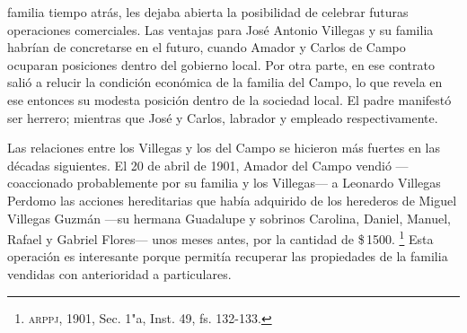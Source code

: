 \documentclass[14pt,twoside,final]{extbook} %
\let\oldfootnote\footnote
\renewcommand\footnote[1]{%
\oldfootnote{\hspace{1mm}#1}}
\begin{document}
familia tiempo atrás, les dejaba abierta la posibilidad de celebrar futuras operaciones comerciales. Las ventajas para José Antonio Villegas y su familia habrían de concretarse en el futuro, cuando Amador y Carlos de Campo ocuparan posiciones dentro del gobierno local. Por otra parte, en ese contrato salió a relucir la condición económica de la familia del Campo, lo que revela en ese entonces su modesta posición dentro de la sociedad local. El padre manifestó ser herrero; mientras que José y Carlos, labrador y empleado respectivamente.

Las relaciones entre los Villegas y los del Campo se hicieron más fuertes en las décadas siguientes. El 20 de abril de 1901, Amador del Campo vendió ---coaccionado probablemente por su familia y los Villegas--- a Leonardo Villegas Perdomo las acciones hereditarias que había adquirido de los herederos de Miguel Villegas Guzmán ---su hermana Guadalupe y sobrinos Carolina, Daniel, Manuel, Rafael y Gabriel Flores--- unos meses antes, por la cantidad de \$\,1500.\footnote{\textsc{arppj}, 1901, Sec. 1"a, Inst. 49, fs. 132-133.} Esta operación es interesante porque permitía recuperar las propiedades de la familia vendidas con anterioridad a particulares.
\end{document}
